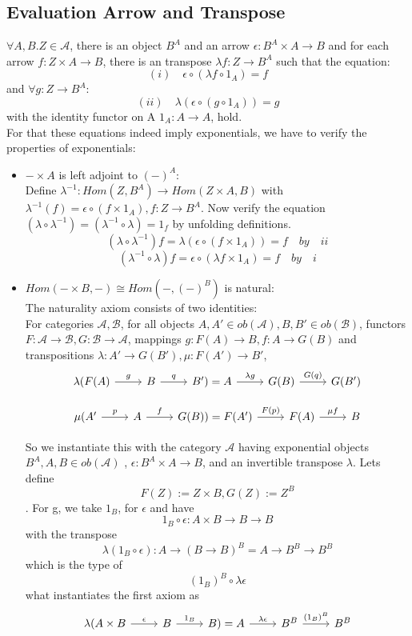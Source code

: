 \subsection{Evaluation Arrow and Transpose}
$\forall A, B. Z\in \mathcal{A}$, there is  an object $B^A$ and an arrow $\epsilon: B^A \times A \to B$ and for each arrow $f:Z \times A \to B$, there is an transpose $\lambda f: Z \to B^A$ such that the equation:
$$(i) \quad \epsilon \circ (\lambda f \circ 1_A) = f$$
and $\forall g: Z \to B^A$:
$$(ii) \quad \lambda (\epsilon \circ (g \circ 1_A))=g$$
with the identity functor on A $1_A: A \to A$, hold.
\\
For that these equations indeed imply exponentials, we have to verify the properties of exponentials:
\begin{itemize}
\item  $- \times A$ is left adjoint to $(-)^A$:
\\Define $\lambda^{-1}: Hom(Z, B^A) \to Hom(Z \times A,B)$ with $\lambda^{-1}(f) = \epsilon \circ (f \times 1_A), f: Z \to B^A$.
Now verify the equation $(\lambda \circ \lambda^{-1}) = (\lambda^{-1} \circ \lambda) = 1_f$ by unfolding definitions.
$$(\lambda \circ \lambda^{-1})f=\lambda(\epsilon \circ (f \times 1_A)) =f \quad by \quad ii$$ 
$$(\lambda^{-1} \circ \lambda)f=\epsilon \circ (\lambda f \times 1_A) =f \quad by \quad i$$
\item $Hom(- \times B, -) \cong Hom(-,(-)^B)$ is natural:
  \\
  The naturality axiom consists of two identities:
  \\
  For categories $\mathcal{A}, \mathcal{B}$, for all objects $A,A' \in ob(\mathcal{A}), B,B' \in ob(\mathcal{B})$, functors $F: \mathcal{A} \to \mathcal{B}, G: \mathcal{B} \to \mathcal{A}$,
  mappings $g:F(A) \to B, f: A \to G(B)$  and transpositions $\lambda:A' \to G(B'),\mu: F(A') \to B'$,
  \[
  \begin{tikzcd}[column sep=normal]
    \lambda(F(A) \arrow{r}{g} & B \arrow{r}{q} & B') = A \arrow{r}{\lambda g} & G(B) \arrow{r}{G(q)} & G(B') 
  \end{tikzcd}
  \]

   \[
   \begin{tikzcd}[column sep=normal]
    \mu(A' \arrow{r}{p} & A \arrow{r}{f} & G(B)) = F(A') \arrow{r}{F(p)} & F(A) \arrow{r}{\mu f} & B 
  \end{tikzcd}
   \]

   So we instantiate this with the category $\mathcal{A}$ having exponential objects $B^A, A,B \in ob(\mathcal{A})$ , $\epsilon: B^A \times A \to B$, and an invertible transpose $\lambda$.
   Lets define $$F(Z):=Z \times B, G(Z):= Z^B$$. 
   For g, we take $1_B$, for $\epsilon$ and have
   $$1_B \circ \epsilon: A \times B \to B \to B $$ with the transpose
   $$\lambda (1_B \circ \epsilon) : A \to (B \to B)^B = A \to B^B \to B^B$$ which is the type of
   $$(1_B)^B \circ \lambda\epsilon$$ what instantiates the first axiom as
   \[
   \begin{tikzcd}[column sep=normal]
     \lambda(A \times B \arrow{r}{\epsilon} & B \arrow{r}{1_B} & B) = A \arrow{r}{\lambda \epsilon} & B^B \arrow{r}{(1_B)^B} & B^B 
   \end{tikzcd}
   \]


\end{itemize}
